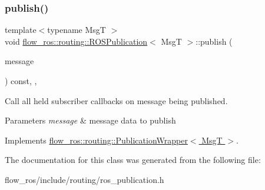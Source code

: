 \subsubsection{\texorpdfstring{publish()}{publish()}}
{\footnotesize\ttfamily template$<$typename MsgT $>$ \\
void \hyperlink{classflow__ros_1_1routing_1_1_r_o_s_publication}{flow\+\_\+ros\+::routing\+::\+R\+O\+S\+Publication}$<$ MsgT $>$\+::publish (\begin{DoxyParamCaption}\item[{const \hyperlink{namespaceflow__ros_a21a684f38ee2083b3858613317c46d82}{message\+\_\+shared\+\_\+ptr\+\_\+t}$<$ MsgT $>$ \&}]{message }\end{DoxyParamCaption}) const\hspace{0.3cm}{\ttfamily [inline]}, {\ttfamily [override]}, {\ttfamily [virtual]}}



Call all held subscriber callbacks on message being published. 


\begin{DoxyParams}{Parameters}
{\em message} & message data to publish \\
\hline
\end{DoxyParams}


Implements \hyperlink{classflow__ros_1_1routing_1_1_publication_wrapper_a43b9989390bf9f001fe9670a0c1d5897}{flow\+\_\+ros\+::routing\+::\+Publication\+Wrapper$<$ Msg\+T $>$}.



The documentation for this class was generated from the following file\+:\begin{DoxyCompactItemize}
\item 
flow\+\_\+ros/include/routing/ros\+\_\+publication.\+h\end{DoxyCompactItemize}

